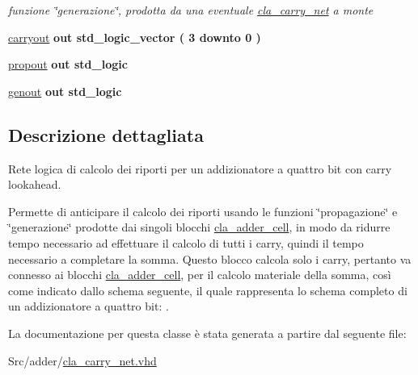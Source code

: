 \begin{DoxyCompactItemize}
\begin{DoxyCompactList}\small\item\em funzione \char`\"{}generazione\char`\"{}, prodotta da una eventuale \hyperlink{classcla__carry__net}{cla\+\_\+carry\+\_\+net} a monte \end{DoxyCompactList}\item 
\hyperlink{group___carry_network_ga6b265f3fe41195485dfedd9824c3598f}{carryout}  {\bfseries {\bfseries \textcolor{vhdlchar}{out}\textcolor{vhdlchar}{ }}} {\bfseries \textcolor{vhdlchar}{std\+\_\+logic\+\_\+vector}\textcolor{vhdlchar}{ }\textcolor{vhdlchar}{(}\textcolor{vhdlchar}{ }\textcolor{vhdlchar}{ } \textcolor{vhdldigit}{3} \textcolor{vhdlchar}{ }\textcolor{vhdlchar}{downto}\textcolor{vhdlchar}{ }\textcolor{vhdlchar}{ } \textcolor{vhdldigit}{0} \textcolor{vhdlchar}{ }\textcolor{vhdlchar}{)}\textcolor{vhdlchar}{ }} 
\item 
\hyperlink{group___carry_network_ga5957c9cdd706cafd2da8855133a002c9}{propout}  {\bfseries {\bfseries \textcolor{vhdlchar}{out}\textcolor{vhdlchar}{ }}} {\bfseries \textcolor{vhdlchar}{std\+\_\+logic}\textcolor{vhdlchar}{ }} 
\item 
\hyperlink{group___carry_network_ga068cd5c4d23e284cb942702252ed1491}{genout}  {\bfseries {\bfseries \textcolor{vhdlchar}{out}\textcolor{vhdlchar}{ }}} {\bfseries \textcolor{vhdlchar}{std\+\_\+logic}\textcolor{vhdlchar}{ }} 
\end{DoxyCompactItemize}


\subsection{Descrizione dettagliata}
Rete logica di calcolo dei riporti per un addizionatore a quattro bit con carry lookahead.

Permette di anticipare il calcolo dei riporti usando le funzioni \char`\"{}propagazione\char`\"{} e \char`\"{}generazione\char`\"{} prodotte dai singoli blocchi \hyperlink{classcla__adder__cell}{cla\+\_\+adder\+\_\+cell}, in modo da ridurre tempo necessario ad effettuare il calcolo di tutti i carry, quindi il tempo necessario a completare la somma. Questo blocco calcola solo i carry, pertanto va connesso ai blocchi \hyperlink{classcla__adder__cell}{cla\+\_\+adder\+\_\+cell}, per il calcolo materiale della somma, così come indicato dallo schema seguente, il quale rappresenta lo schema completo di un addizionatore a quattro bit\+: . 

La documentazione per questa classe è stata generata a partire dal seguente file\+:\begin{DoxyCompactItemize}
\item 
Src/adder/\hyperlink{cla__carry__net_8vhd}{cla\+\_\+carry\+\_\+net.\+vhd}\end{DoxyCompactItemize}
